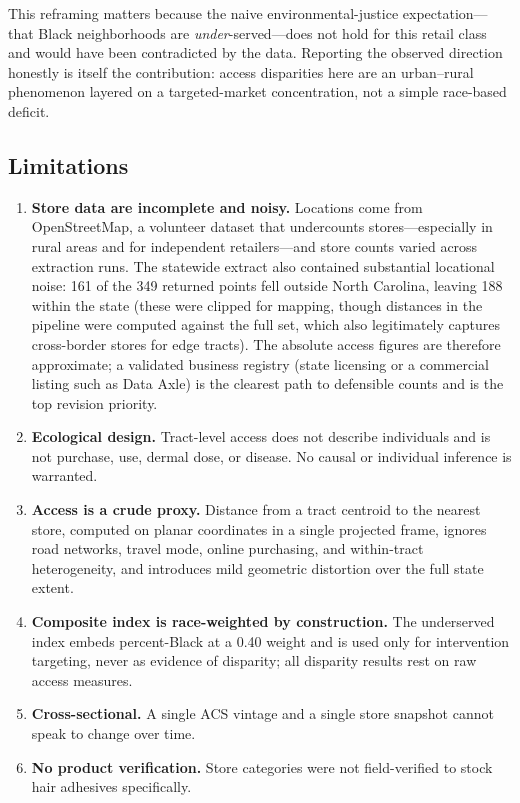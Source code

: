 \documentclass[12pt,letterpaper]{article}
\begin{document}
This reframing matters because the naive environmental-justice expectation---that
Black neighborhoods are \emph{under}-served---does not hold for this retail class
and would have been contradicted by the data. Reporting the observed direction
honestly is itself the contribution: access disparities here are an urban--rural
phenomenon layered on a targeted-market concentration, not a simple
race-based deficit.

\subsection{Limitations}

\begin{enumerate}
\item \textbf{Store data are incomplete and noisy.} Locations come from
OpenStreetMap, a volunteer dataset that undercounts stores---especially in rural
areas and for independent retailers---and store counts varied across extraction
runs. The statewide extract also contained substantial locational noise: 161 of
the 349 returned points fell outside North Carolina, leaving 188 within the
state (these were clipped for mapping, though distances in the pipeline were
computed against the full set, which also legitimately captures cross-border
stores for edge tracts). The absolute access figures are therefore approximate;
a validated business registry (state licensing or a commercial listing such as
Data Axle) is the clearest path to defensible counts and is the top revision
priority.
\item \textbf{Ecological design.} Tract-level access does not describe
individuals and is not purchase, use, dermal dose, or disease. No causal or
individual inference is warranted.
\item \textbf{Access is a crude proxy.} Distance from a tract centroid to the
nearest store, computed on planar coordinates in a single projected frame,
ignores road networks, travel mode, online purchasing, and within-tract
heterogeneity, and introduces mild geometric distortion over the full state
extent.
\item \textbf{Composite index is race-weighted by construction.} The underserved
index embeds percent-Black at a 0.40 weight and is used only for intervention
targeting, never as evidence of disparity; all disparity results rest on raw
access measures.
\item \textbf{Cross-sectional.} A single ACS vintage and a single store snapshot
cannot speak to change over time.
\item \textbf{No product verification.} Store categories were not field-verified
to stock hair adhesives specifically.
\end{enumerate}
\end{document}
